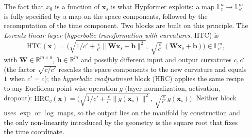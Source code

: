 The fact that $x_0$ is a function of $\mathbf{x}_s$ is what Hypformer exploits: a map $\mathbb{L}^n_c \to \mathbb{L}^m_{c'}$ is fully specified by a map on the space components, followed by the recomputation of the time component. Two blocks are built on this principle. The \emph{Lorentz linear layer} (\emph{hyperbolic transformation with curvatures}, HTC) is
\begin{equation}
    \text{HTC}(\mathbf{x}) = \Big( \sqrt{1/c' + \tfrac{c}{c'}\|\mathbf{W}\mathbf{x}_s + \mathbf{b}\|^2}, \; \sqrt{\tfrac{c}{c'}}\,(\mathbf{W}\mathbf{x}_s + \mathbf{b}) \Big) \in \mathbb{L}^m_{c'},
    \label{eq:hypformer_htc}
\end{equation}
with $\mathbf{W} \in \mathbb{R}^{m \times n}$, $\mathbf{b} \in \mathbb{R}^m$ and possibly different input and output curvatures $c, c'$ (the factor $\sqrt{c/c'}$ rescales the space components to the new curvature and equals $1$ when $c' = c$); the \emph{hyperbolic readjustment} block (HRC) applies the same recipe to any Euclidean point-wise operation $g$ (layer normalization, activation, dropout): $\text{HRC}_g(\mathbf{x}) = \big(\sqrt{1/c' + \tfrac{c}{c'}\|g(\mathbf{x}_s)\|^2}, \, \sqrt{\tfrac{c}{c'}}\, g(\mathbf{x}_s)\big)$. Neither block uses $\exp$ or $\log$ maps, so the output lies on the manifold by construction and the only non-linearity introduced by the geometry is the square root that fixes the time coordinate.


